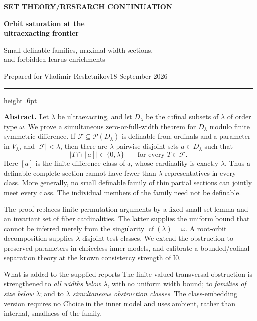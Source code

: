 \documentclass[11pt,letterpaper]{article}
\theoremstyle{definition}
\numberwithin{equation}{section}
\newcommand{\cf}{\operatorname{cf}}
\newcommand{\Pow}{\mathcal P}
\newcommand{\Izero}{\mathrm{I0}}
\newcommand{\FF}{\mathcal F}
\begin{document}
\thispagestyle{empty}
{\sffamily\bfseries\small\color{Olive}SET THEORY\quad /\quad RESEARCH CONTINUATION}

\vspace{13pt}
{\fontsize{28}{31}\selectfont\bfseries\color{Forest}Orbit saturation at the\\ ultraexacting frontier\par}
\vspace{10pt}
{\fontsize{14}{18}\selectfont Small definable families, maximal-width sections,\\ and forbidden Icarus enrichments\par}
\vspace{14pt}
{\color{Muted}Prepared for Vladimir Reshetnikov\hfill 18 September 2026\par}
\vspace{3pt}
{\color{Sage}\hrule height .6pt}
\vspace{12pt}

\textbf{Abstract.}
Let $\lambda$ be ultraexacting, and let $D_\lambda$ be the cofinal subsets of $\lambda$ of order type $\omega$. We prove a simultaneous zero-or-full-width theorem for $D_\lambda$ modulo finite symmetric difference. If $\FF\subseteq\Pow(D_\lambda)$ is definable from ordinals and a parameter in $V_\lambda$, and $|\FF|<\lambda$, then there are $\lambda$ pairwise disjoint sets $a\in D_\lambda$ such that
\[
  |T\cap[a]|\in\{0,\lambda\}\qquad\text{for every }T\in\FF.
\]
Here $[a]$ is the finite-difference class of $a$, whose cardinality is exactly $\lambda$. Thus a definable complete section cannot have fewer than $\lambda$ representatives in every class. More generally, no small definable family of thin partial sections can jointly meet every class. The individual members of the family need not be definable.

The proof replaces finite permutation arguments by a fixed-small-set lemma and an invariant set of fiber cardinalities. The latter supplies the uniform bound that cannot be inferred merely from the singularity $\cf(\lambda)=\omega$. A root-orbit decomposition supplies $\lambda$ disjoint test classes. We extend the obstruction to preserved parameters in choiceless inner models, and calibrate a bounded/cofinal separation theory at the known consistency strength of $\Izero$.

\begin{assessment}{What is added to the supplied reports}
The finite-valued transversal obstruction is strengthened to \emph{all widths below $\lambda$}, with no uniform width bound; to \emph{families of size below $\lambda$}; and to \emph{$\lambda$ simultaneous obstruction classes}. The class-embedding version requires no Choice in the inner model and uses ambient, rather than internal, smallness of the family.
\end{assessment}
\end{document}
